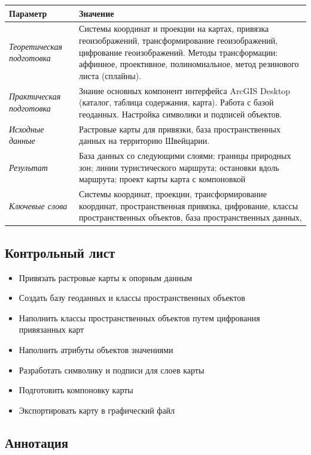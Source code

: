 \documentclass[12pt,]{book}
\providecommand{\tightlist}{%
  \setlength{\itemsep}{0pt}\setlength{\parskip}{0pt}}
\begin{document}
\begin{longtable}[]{@{}ll@{}}
\toprule
Параметр & Значение\tabularnewline
\midrule
\endhead
\emph{Теоретическая подготовка} & Системы координат и проекции на картах, привязка геоизображений, трансформирование геоизображений, цифрование геоизображений. Методы трансформации: аффинное, проективное, полиномиальное, метод резинового листа (сплайны).\tabularnewline
\emph{Практическая подготовка} & Знание основных компонент интерфейса ArcGIS Desktop (каталог, таблица содержания, карта). Работа с базой геоданных. Настройка символики и подписей объектов.\tabularnewline
\emph{Исходные данные} & Растровые карты для привязки, база пространственных данных на территорию Швейцарии.\tabularnewline
\emph{Результат} & База данных со следующими слоями: границы природных зон; линии туристического маршрута; остановки вдоль маршрута; проект карты карта с компоновкой\tabularnewline
\emph{Ключевые слова} & Системы координат, проекции, трансформирование координат, пространственная привязка, цифрование, классы пространственных объектов, база пространственных данных,\tabularnewline
\bottomrule
\end{longtable}

\hypertarget{map-ref-general-control}{%
\subsection{Контрольный лист}\label{map-ref-general-control}}

\begin{itemize}
\tightlist
\item
  Привязать растровые карты к опорным данным
\item
  Создать базу геоданных и классы пространственных объектов
\item
  Наполнить классы пространственных объектов путем цифрования привязанных карт
\item
  Наполнить атрибуты объектов значениями
\item
  Разработать символику и подписи для слоев карты
\item
  Подготовить компоновку карты
\item
  Экспортировать карту в графический файл
\end{itemize}

\hypertarget{map-ref-general-anno}{%
\subsection{Аннотация}\label{map-ref-general-anno}}
\end{document}
